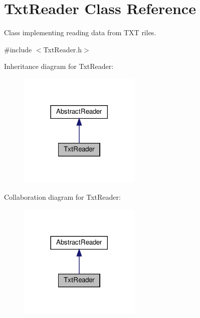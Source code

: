 \hypertarget{class_txt_reader}{}\section{Txt\+Reader Class Reference}
\label{class_txt_reader}


Class implementing reading data from T\+XT riles.  




{\ttfamily \#include $<$Txt\+Reader.\+h$>$}



Inheritance diagram for Txt\+Reader\+:\nopagebreak
\begin{figure}[H]
\begin{center}
\leavevmode
\includegraphics[width=165pt]{class_txt_reader__inherit__graph}
\end{center}
\end{figure}


Collaboration diagram for Txt\+Reader\+:\nopagebreak
\begin{figure}[H]
\begin{center}
\leavevmode
\includegraphics[width=165pt]{class_txt_reader__coll__graph}
\end{center}
\end{figure}
